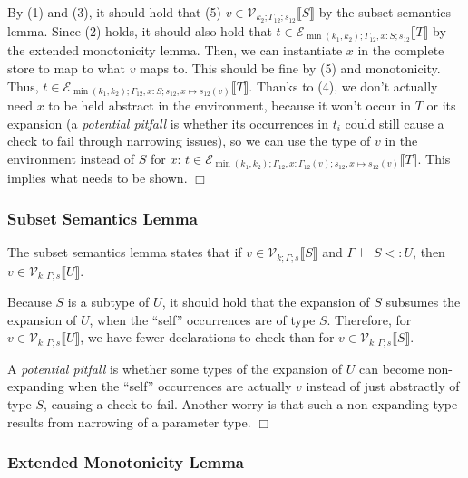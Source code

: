\documentclass[9pt]{sigplanconf}
\newenvironment{proofsketch}{{\em Proof Sketch:}}{$\Box$}
\newcommand{\ts}{\,\vdash\,}
\newcommand{\nswfe}{\mbox{\textbf{wfe}}}
\newcommand{\envplus}[1]{, #1}
\newcommand{\relv}[4]{\mathcal{V}_{#1;#2;#3}\llbracket#4\rrbracket}
\newcommand{\rele}[4]{\mathcal{E}_{#1;#2;#3}\llbracket#4\rrbracket}
\begin{document}
\begin{proofsketch}
By (1) and (3), it should hold that (5) $v \in \relv {k_2}
{\Gamma_{12}} {s_{12}} {S}$ by the subset semantics lemma.  Since (2)
holds, it should also hold that ${t} \in \rele {\min(k_1,k_2)}
{\Gamma_{12} \envplus{{x} : S}} {s_{12}} T$ by the extended
monotonicity lemma. Then, we can instantiate $x$ in the complete store
to map to what $v$ maps to. This should be fine by (5) and
monotonicity. Thus, ${t} \in \rele {\min(k_1,k_2)} {\Gamma_{12}
  \envplus{{x} : S}} {s_{12} \envplus{{x} \mapsto s_{12}(v)}}
T$. Thanks to (4), we don't actually need $x$ to be held abstract in
the environment, because it won't occur in $T$ or its expansion (a
{\it potential pitfall} is whether its occurrences in $t_i$ could
still cause a check to fail through narrowing issues), so we can use
the type of $v$ in the environment instead of $S$ for $x$: ${t} \in
\rele {\min(k_1,k_2)} {\Gamma_{12} \envplus{{x} : {\Gamma_{12}(v)}}}
      {s_{12} \envplus{{x} \mapsto s_{12}(v)}} T$. This implies what
      needs to be shown.
\end{proofsketch}

\subsubsection{Subset Semantics Lemma}

The subset semantics lemma states that if $v \in \relv k \Gamma s S$
and $\Gamma \ts S <: U$, then $v \in \relv k \Gamma s U$.

\begin{proofsketch}
Because $S$ is a subtype of $U$, it should hold that the expansion of
$S$ subsumes the expansion of $U$, when the ``self'' occurrences are
of type $S$. Therefore, for $v \in \relv k \Gamma s U$, we have fewer
declarations to check than for $v \in \relv k \Gamma s S$.

A {\it potential pitfall} is whether some types of the expansion of
$U$ can become non-expanding when the ``self'' occurrences are
actually $v$ instead of just abstractly of type $S$, causing a check
to fail. Another worry is that such a non-expanding type results from
narrowing of a parameter type.
\end{proofsketch}

\subsubsection{Extended Monotonicity Lemma}
\end{document}
